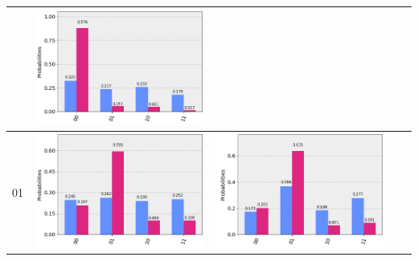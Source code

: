 \documentclass[11pt]{article}
\begin{document}
\begin{table}[h!]
\begin{tabular}{| c | c | c | c | c | }
\begin{minipage}{.215\textwidth}
    \end{minipage}
    &\begin{minipage}{.215\textwidth}
    \includegraphics[width=\linewidth]{img/rand_qecc3_I00.png}
    \end{minipage}
    \\ \hline
    01 & 
    \begin{minipage}{.215\textwidth}
    \includegraphics[width=\linewidth]{img/rand_qecc3_X01.png}
    \end{minipage}&
    \begin{minipage}{.215\textwidth}
    \includegraphics[width=\linewidth]{img/rand_qecc3_Y01.png}

\end{minipage}
\end{tabular}
\end{table}
\end{document}
